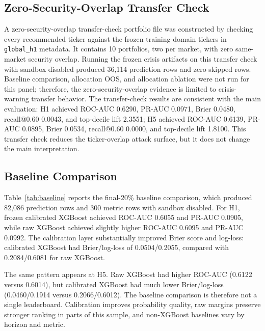 \documentclass{ieeeaccess}
\begin{document}
\subsection{Zero-Security-Overlap Transfer Check}
A zero-security-overlap transfer-check portfolio file was constructed by checking every recommended ticker against the frozen training-domain tickers in \texttt{global\_h1} metadata. It contains 10 portfolios, two per market, with zero same-market security overlap. Running the frozen crisis artifacts on this transfer check with sandbox disabled produced 36,114 prediction rows and zero skipped rows. Baseline comparison, allocation OOS, and allocation ablation were not run for this panel; therefore, the zero-security-overlap evidence is limited to crisis-warning transfer behavior. The transfer-check results are consistent with the main evaluation: H1 achieved ROC-AUC 0.6290, PR-AUC 0.0971, Brier 0.0480, recall@0.60 0.0043, and top-decile lift 2.3551; H5 achieved ROC-AUC 0.6139, PR-AUC 0.0895, Brier 0.0534, recall@0.60 0.0000, and top-decile lift 1.8100. This transfer check reduces the ticker-overlap attack surface, but it does not change the main interpretation.

\subsection{Baseline Comparison}
Table~\ref{tab:baseline} reports the final-20\% baseline comparison, which produced 82,086 prediction rows and 300 metric rows with sandbox disabled. For H1, frozen calibrated XGBoost achieved ROC-AUC 0.6055 and PR-AUC 0.0905, while raw XGBoost achieved slightly higher ROC-AUC 0.6095 and PR-AUC 0.0992. The calibration layer substantially improved Brier score and log-loss: calibrated XGBoost had Brier/log-loss of 0.0504/0.2055, compared with 0.2084/0.6081 for raw XGBoost.

The same pattern appears at H5. Raw XGBoost had higher ROC-AUC (0.6122 versus 0.6014), but calibrated XGBoost had much lower Brier/log-loss (0.0460/0.1914 versus 0.2066/0.6012). The baseline comparison is therefore not a single leaderboard. Calibration improves probability quality, raw margins preserve stronger ranking in parts of this sample, and non-XGBoost baselines vary by horizon and metric.
\end{document}
